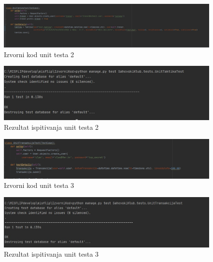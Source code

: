 \begin{figure}[H]
	\centerfloat
	\includegraphics[scale=0.40]{slike/unittest2izv.jpeg} %
	\caption{Izvorni kod unit testa 2}
	
\end{figure}
	
	\begin{figure}[H]
		\centerfloat
		\includegraphics[scale=0.55]{slike/unittest2.jpeg} %
		\caption{Rezultat ispitivanja unit testa 2}
		
	\end{figure}

\begin{figure}[H]
	\centerfloat
	\includegraphics[scale=0.55]{slike/unittest3izv.jpeg} %
	\caption{Izvorni kod unit testa 3}
	
\end{figure}

\begin{figure}[H]
	\centerfloat
	\includegraphics[scale=0.55]{slike/unittest3.jpeg} %
	\caption{Rezultat ispitivanja unit testa 3}
	
\end{figure}

